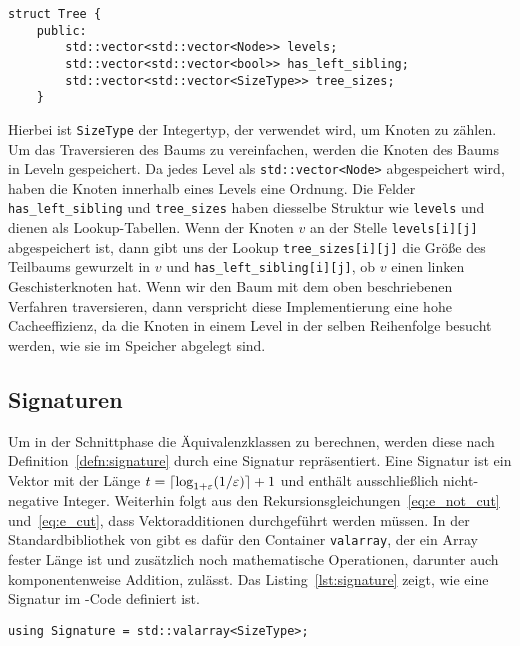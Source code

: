 \begin{lstlisting}[caption={Definition von \texttt{struct Tree}}, label={lst:structtree}]
struct Tree {
    public:
        std::vector<std::vector<Node>> levels;
        std::vector<std::vector<bool>> has_left_sibling;
        std::vector<std::vector<SizeType>> tree_sizes;
    }
\end{lstlisting}
 Hierbei ist \texttt{SizeType} der Integertyp, der verwendet wird, um Knoten zu zählen.
Um das Traversieren des Baums zu vereinfachen, werden die Knoten des Baums in Leveln gespeichert.
Da jedes Level als \texttt{std::vector<Node>} abgespeichert wird, haben die Knoten innerhalb eines Levels eine Ordnung.
Die Felder \texttt{has\_left\_sibling} und \texttt{tree\_sizes} haben diesselbe Struktur wie \texttt{levels} und dienen als Lookup-Tabellen.
Wenn der Knoten $v$ an der Stelle \texttt{levels[i][j]} abgespeichert ist, dann gibt uns der Lookup \texttt{tree\_sizes[i][j]} die Größe des Teilbaums gewurzelt in $v$ und \texttt{has\_left\_sibling[i][j]}, ob $v$ einen linken Geschisterknoten hat.
Wenn wir den Baum mit dem oben beschriebenen Verfahren traversieren, dann verspricht diese Implementierung eine hohe Cacheeffizienz, da die Knoten in einem Level in der selben Reihenfolge besucht werden, wie sie im Speicher abgelegt sind.

\subsection{Signaturen}
Um in der Schnittphase die Äquivalenzklassen zu berechnen, werden diese nach Definition~\ref{defn:signature} durch eine Signatur repräsentiert.
Eine Signatur ist ein Vektor mit der Länge $t = \lceil\log_{1+\varepsilon}(1/\varepsilon)\rceil + 1$ und enthält ausschließlich nicht-negative Integer.
Weiterhin folgt aus den Rekursionsgleichungen~\eqref{eq:e_not_cut} und~\eqref{eq:e_cut}, dass Vektoradditionen durchgeführt werden müssen.
In der Standardbibliothek von \Cpp{} gibt es dafür den Container \texttt{valarray}, der ein Array fester Länge ist und zusätzlich noch mathematische Operationen, darunter auch komponentenweise Addition, zulässt. 
Das Listing~\ref{lst:signature} zeigt, wie eine Signatur im \Cpp\hyp Code definiert ist.
\begin{lstlisting}[caption={Definition von \texttt{Signature}}, label={lst:signature}]
using Signature = std::valarray<SizeType>;
\end{lstlisting}

